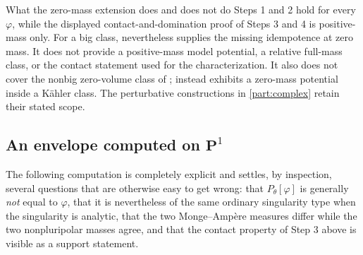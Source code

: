 \begin{warning}{What the zero-mass extension does and does not do}
\label{warn:ch51-p-positive-mass}
Steps 1 and 2 hold for every \(\varphi\), while the displayed
contact-and-domination proof of Steps 3 and 4 is positive-mass only.
For a big class, \cite[Theorem~1.2]{PSWZ26} nevertheless supplies the
missing idempotence at zero mass.  It does not provide a positive-mass
model potential, a relative full-mass class, or the contact statement used
for the characterization.  It also does not cover the nonbig
zero-volume class of ;
 instead exhibits a zero-mass potential inside a
K\"ahler class.  The perturbative constructions in
\cref{part:complex} retain their stated scope.
\end{warning}

\subsection{An envelope computed on
\texorpdfstring{\(\mathbf P^1\)}{P1}}
\label{sec:ch51-p1-envelope}

The following computation is completely explicit and settles, by
inspection, several questions that are otherwise easy to get wrong: that
\(P_\theta[\varphi]\) is generally \emph{not} equal to \(\varphi\), that
it is nevertheless of the same ordinary singularity type when the
singularity is analytic, that the two Monge--Amp\`ere measures differ
while the two nonpluripolar masses agree, and that the contact property of
Step 3 above is visible as a support statement.

